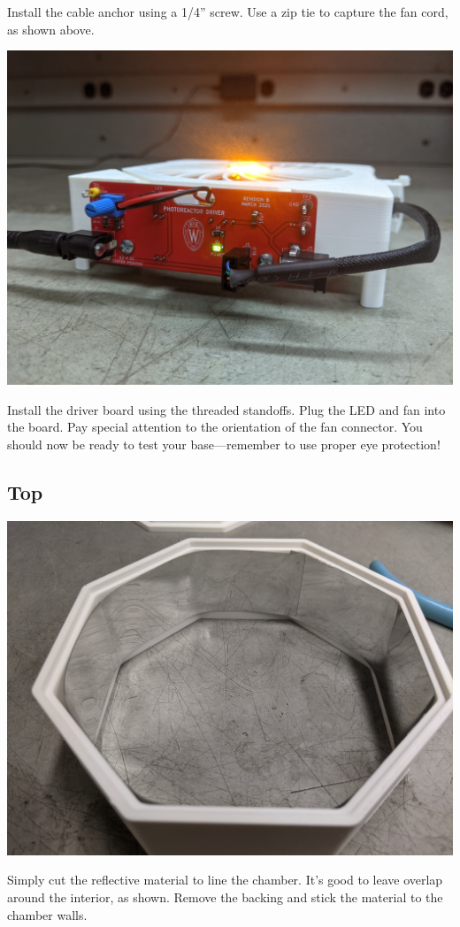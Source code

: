 \documentclass[11pt]{article}
\begin{document}
Install the cable anchor using a 1/4'' screw.
Use a zip tie to capture the fan cord, as shown above.

\clearpage

\begin{center}
  \includegraphics[width=\textwidth/2]{"./driver-on-base.jpg"}
\end{center}

Install the driver board using the threaded standoffs.
Plug the LED and fan into the board.
Pay special attention to the orientation of the fan connector.
You should now be ready to test your base---remember to use proper eye protection!

\clearpage
\subsection{Top} \label{SEC:top}

\begin{center}
  \includegraphics[width=\textwidth/2]{"./reflector.jpg"}
\end{center}

Simply cut the reflective material to line the chamber.
It's good to leave overlap around the interior, as shown.
Remove the backing and stick the material to the chamber walls.
\end{document}
